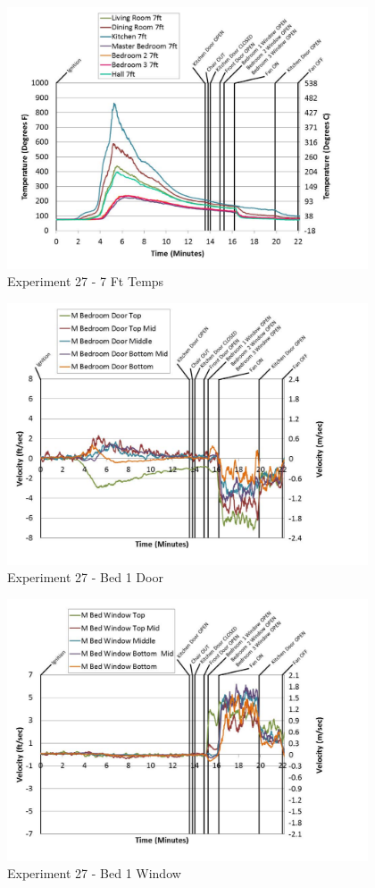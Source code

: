 \documentclass{article}
\begin{document}
\begin{appendices}
	\begin{figure}[h!]
		\centering
		\includegraphics[height=3.05in]{0_Images/Results_Charts/Exp_27_Charts/7FtTemps.pdf}
		\caption{Experiment 27 - 7 Ft Temps}
	\end{figure}
 
	\clearpage

	\begin{figure}[h!]
		\centering
		\includegraphics[height=3.05in]{0_Images/Results_Charts/Exp_27_Charts/Bed1Door.pdf}
		\caption{Experiment 27 - Bed 1 Door}
	\end{figure}
 

	\begin{figure}[h!]
		\centering
		\includegraphics[height=3.05in]{0_Images/Results_Charts/Exp_27_Charts/Bed1Window.pdf}
		\caption{Experiment 27 - Bed 1 Window}
	\end{figure}
 

\end{appendices}
\end{document}
